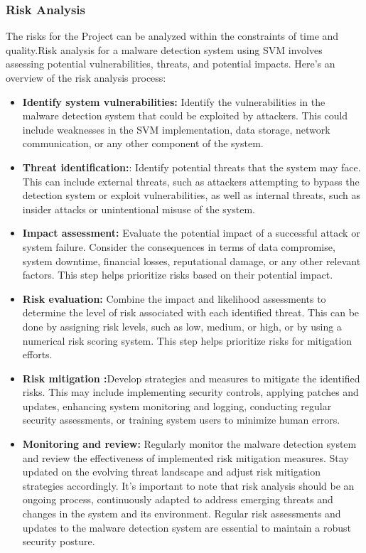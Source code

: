 \documentclass[12pt]{report}
\begin{document}
\subsubsection{Risk Analysis}
\justifying
\setlength{\parindent}{4em}
\setlength{\parskip}{0.5em}
\renewcommand{\baselinestretch}{1.5}
\vspace{0.1cm}
\normalsize
The risks for the Project can be analyzed within the constraints of time and quality.Risk analysis for a malware detection system using SVM involves assessing potential vulnerabilities, threats, and potential impacts. Here's an overview of the risk analysis process:
\begin{itemize}
\item \textbf{Identify system vulnerabilities:} Identify the vulnerabilities in the malware detection system that could be exploited by attackers. This could include weaknesses in the SVM implementation, data storage, network communication, or any other component of the system.
\item \textbf{Threat identification:}: Identify potential threats that the system may face. This can include external threats, such as attackers attempting to bypass the detection system or exploit vulnerabilities, as well as internal threats, such as insider attacks or unintentional misuse of the system.
\item \textbf{Impact assessment: } Evaluate the potential impact of a successful attack or system failure. Consider the consequences in terms of data compromise, system downtime, financial losses, reputational damage, or any other relevant factors. This step helps prioritize risks based on their potential impact.
\item \textbf{Risk evaluation:} Combine the impact and likelihood assessments to determine the level of risk associated with each identified threat. This can be done by assigning risk levels, such as low, medium, or high, or by using a numerical risk scoring system. This step helps prioritize risks for mitigation efforts.
\item \textbf{Risk mitigation :}Develop strategies and measures to mitigate the identified risks. This may include implementing security controls, applying patches and updates, enhancing system monitoring and logging, conducting regular security assessments, or training system users to minimize human errors.
\item \textbf{Monitoring and review:} Regularly monitor the malware detection system and review the effectiveness of implemented risk mitigation measures. Stay updated on the evolving threat landscape and adjust risk mitigation strategies accordingly.
It's important to note that risk analysis should be an ongoing process, continuously adapted to address emerging threats and changes in the system and its environment. Regular risk assessments and updates to the malware detection system are essential to maintain a robust security posture.

\end{itemize}
\vspace{14cm}
\end{document}
